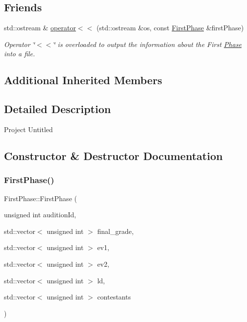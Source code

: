 \subsection*{Friends}
\begin{DoxyCompactItemize}
\item 
std\+::ostream \& \hyperlink{class_first_phase_a402f79e6ed4dcdeaf9745b245ff1b375}{operator$<$$<$} (std\+::ostream \&os, const \hyperlink{class_first_phase}{First\+Phase} \&first\+Phase)
\begin{DoxyCompactList}\small\item\em Operator \char`\"{}$<$$<$\char`\"{} is overloaded to output the information about the First \hyperlink{class_phase}{Phase} into a file. \end{DoxyCompactList}\end{DoxyCompactItemize}
\subsection*{Additional Inherited Members}


\subsection{Detailed Description}
Project Untitled 

\subsection{Constructor \& Destructor Documentation}
\mbox{\label{class_first_phase_a1c8d914b5b30eff510d884cc4ab699d6}} 
\subsubsection{\texorpdfstring{First\+Phase()}{FirstPhase()}\hspace{0.1cm}{\footnotesize\ttfamily [1/2]}}
{\footnotesize\ttfamily First\+Phase\+::\+First\+Phase (\begin{DoxyParamCaption}\item[{unsigned int}]{audition\+Id,  }\item[{std\+::vector$<$ unsigned int $>$}]{final\+\_\+grade,  }\item[{std\+::vector$<$ unsigned int $>$}]{ev1,  }\item[{std\+::vector$<$ unsigned int $>$}]{ev2,  }\item[{std\+::vector$<$ unsigned int $>$}]{ld,  }\item[{std\+::vector$<$ unsigned int $>$}]{contestants }\end{DoxyParamCaption})}



